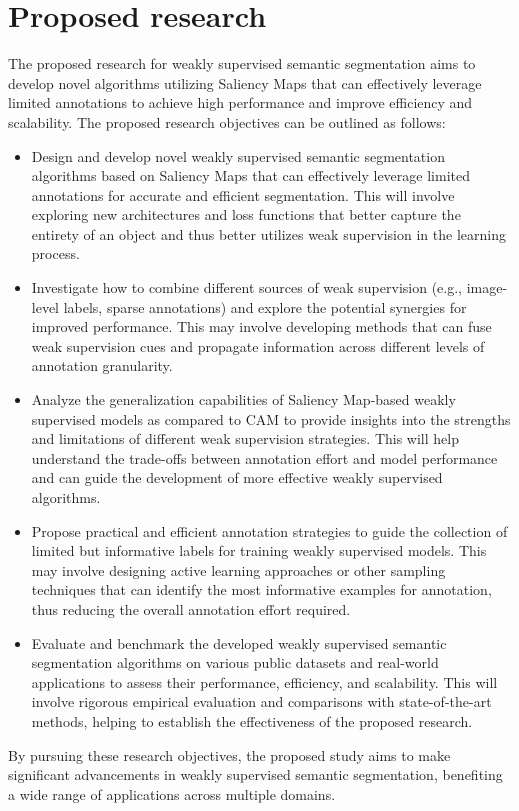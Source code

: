\documentclass[11pt]{article}
\begin{document}
\section{Proposed research}
The proposed research for weakly supervised semantic segmentation aims to develop novel algorithms utilizing Saliency Maps that can effectively leverage limited annotations to achieve high performance and improve efficiency and scalability. The proposed research objectives can be outlined as follows:
\begin{itemize}
\item Design and develop novel weakly supervised semantic segmentation algorithms based on Saliency Maps that can effectively leverage limited annotations for accurate and efficient segmentation. This will involve exploring new architectures and loss functions that better capture the entirety of an object and thus better utilizes weak supervision in the learning process.
\item Investigate how to combine different sources of weak supervision (e.g., image-level labels, sparse annotations) and explore the potential synergies for improved performance. This may involve developing methods that can fuse weak supervision cues and propagate information across different levels of annotation granularity.
\item Analyze the generalization capabilities of Saliency Map-based weakly supervised models as compared to CAM to provide insights into the strengths and limitations of different weak supervision strategies. This will help understand the trade-offs between annotation effort and model performance and can guide the development of more effective weakly supervised algorithms.
\item Propose practical and efficient annotation strategies to guide the collection of limited but informative labels for training weakly supervised models. This may involve designing active learning approaches or other sampling techniques that can identify the most informative examples for annotation, thus reducing the overall annotation effort required.
\item Evaluate and benchmark the developed weakly supervised semantic segmentation algorithms on various public datasets and real-world applications to assess their performance, efficiency, and scalability. This will involve rigorous empirical evaluation and comparisons with state-of-the-art methods, helping to establish the effectiveness of the proposed research.
\end{itemize}
By pursuing these research objectives, the proposed study aims to make significant advancements in weakly supervised semantic segmentation, benefiting a wide range of applications across multiple domains.
\end{document}
